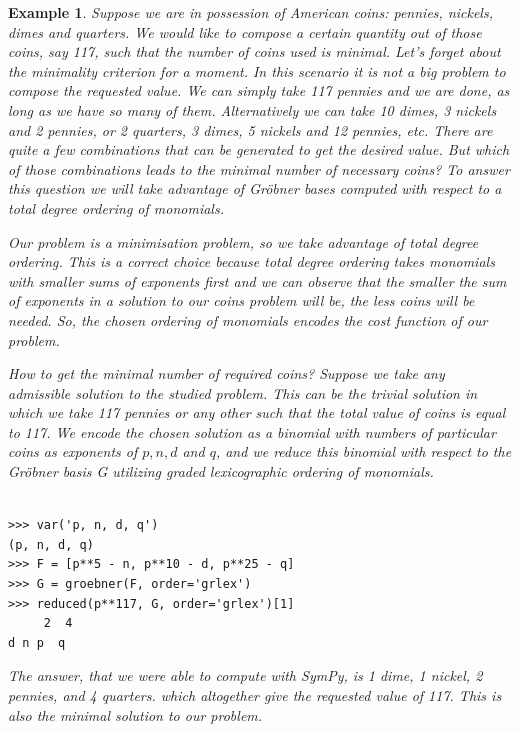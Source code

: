 \documentclass[12pt]{article}
\newtheorem{example}[theorem]{Example}
\begin{document}
\begin{example}
{\rm
Suppose we are in possession of American coins: pennies, nickels,
dimes and quarters. We would like to compose a certain quantity out of
those coins, say 117, such that the number of coins used is
minimal. Let's forget about the minimality criterion for a moment. In
this scenario it is not a big problem to compose the requested
value. We can simply take 117 pennies and we are done, as long as we
have so many of them. Alternatively we can take 10 dimes, 3 nickels
and 2 pennies, or 2 quarters, 3 dimes, 5 nickels and 12 pennies,
etc. There are quite a few combinations that can be generated to get
the desired value. But which of those combinations leads to the
minimal number of necessary coins? To answer this question we will
take advantage of Gr\"obner bases computed with respect to a total
degree ordering of monomials.

Our problem is a minimisation problem, so we take advantage of total
degree ordering.
This is a correct choice because total degree ordering takes monomials
with smaller sums
of exponents first and we can observe that the smaller the sum of
exponents in a solution
to our coins problem will be, the less coins will be needed. So, the
chosen ordering of
monomials encodes the cost function of our problem.

How to get the minimal number of required coins? Suppose we take any
admissible solution
to the studied problem. This can be the trivial solution in which we
take 117 pennies or any
other such that the total value of coins is equal to 117. We encode
the chosen solution as a
binomial with numbers of particular coins as exponents of $p, n, d$ and
$q$, and we reduce this
binomial with respect to the Gr\"obner basis G utilizing
graded lexicographic ordering of monomials.


\begin{Verbatim}[fontsize=\scriptsize,fontfamily=courier,fontshape=tt,frame=single,label=SymPy]

>>> var('p, n, d, q')
(p, n, d, q)
>>> F = [p**5 - n, p**10 - d, p**25 - q]
>>> G = groebner(F, order='grlex')
>>> reduced(p**117, G, order='grlex')[1]
     2  4
d n p  q

\end{Verbatim}

\noindent
The answer, that we were able to compute with SymPy, is 1
dime, 1 nickel, 2 pennies, and 4 quarters.
which altogether give the requested value of 117. This is also the minimal solution to our problem.
}
\end{example}
\end{document}
